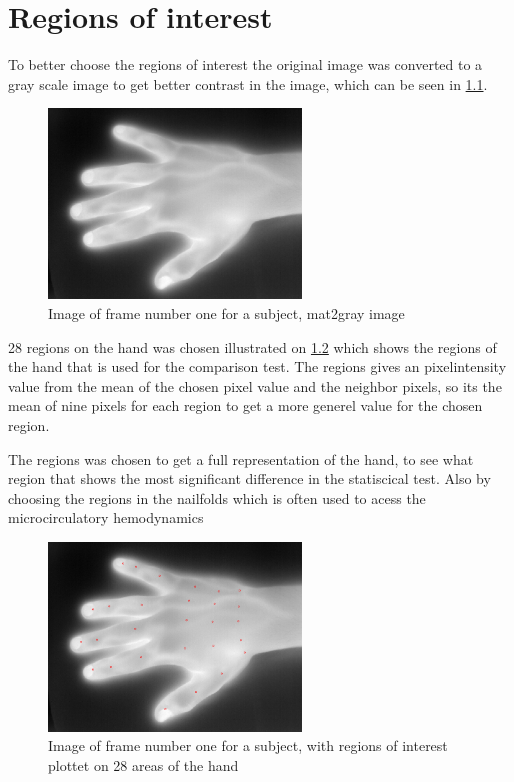 \chapter{Regions of interest}

To better choose the regions of interest the original image was converted to a gray scale image to get better contrast in the image, which can be seen in \ref{fig:mat2grayHand}. 

\begin{figure}[H]
	\includegraphics[width=0.6\textwidth]{figures/mat2grayHand}  %
	\caption{Image of frame number one for a subject, mat2gray image}
	\label{fig:mat2grayHand}  %
\end{figure}

28 regions on the hand was chosen illustrated on \ref{fig:roiHand} which shows the regions of the hand that is used for the comparison test. The regions gives an pixelintensity value from the mean of the chosen pixel value and the neighbor pixels, so its the mean of nine pixels for each region to get a more generel value for the chosen region.

The regions was chosen to get a full representation of the hand, to see what region that shows the most significant difference in the statiscical test. Also by choosing the regions in the nailfolds which is often used to acess the microcirculatory hemodynamics \cite{martina1998}

\begin{figure}[H]
	\includegraphics[width=0.6\textwidth]{figures/roiHand}  %
	\caption{Image of frame number one for a subject, with regions of interest plottet on 28 areas of the hand}
	\label{fig:roiHand}  %
\end{figure}

